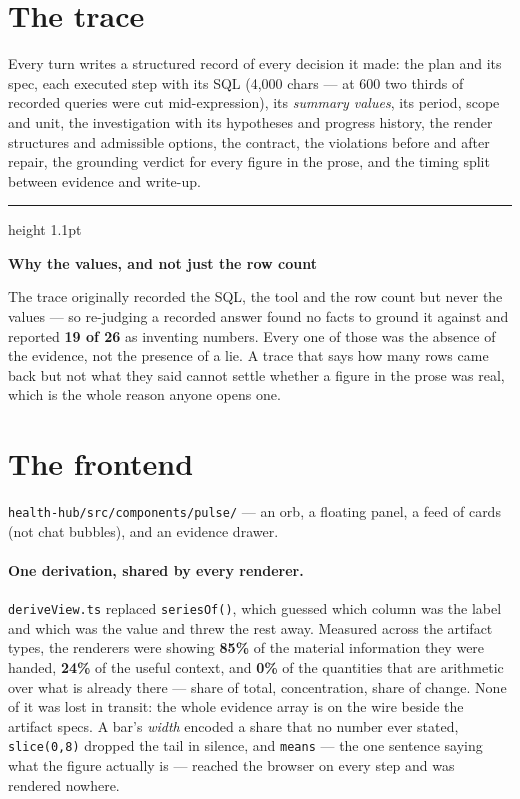 \documentclass[11pt,a4paper]{report}
\newcommand{\file}[1]{\texttt{\small #1}}
\newcommand{\code}[1]{\texttt{\small #1}}
\newenvironment{keybox}[1]
 {\par\medskip\begin{center}\begin{minipage}{0.94\textwidth}%
  {\color{navy}\hrule height 1.1pt}\vspace{5pt}\par
  \textbf{\color{navy}#1}\par\vspace{3pt}\small}
 {\par\vspace{5pt}{\color{mist}\hrule height 0.8pt}\end{minipage}\end{center}\medskip}
\begin{document}
\section{The trace}

Every turn writes a structured record of every decision it made: the plan and its spec, each
executed step with its SQL (4{,}000 chars --- at 600 two thirds of recorded queries were cut
mid-expression), its \emph{summary values}, its period, scope and unit, the investigation with its
hypotheses and progress history, the render structures and admissible options, the contract, the
violations before and after repair, the grounding verdict for every figure in the prose, and the
timing split between evidence and write-up.

\begin{keybox}{Why the values, and not just the row count}
The trace originally recorded the SQL, the tool and the row count but never the values --- so
re-judging a recorded answer found no facts to ground it against and reported \textbf{19 of 26} as
inventing numbers. Every one of those was the absence of the evidence, not the presence of a lie. A
trace that says how many rows came back but not what they said cannot settle whether a figure in
the prose was real, which is the whole reason anyone opens one.
\end{keybox}

\section{The frontend}

\file{health-hub/src/components/pulse/} --- an orb, a floating panel, a feed of cards (not chat
bubbles), and an evidence drawer.

\paragraph{One derivation, shared by every renderer.} \file{deriveView.ts} replaced
\code{seriesOf()}, which guessed which column was the label and which was the value and threw the
rest away. Measured across the artifact types, the renderers were showing \textbf{85\%} of the
material information they were handed, \textbf{24\%} of the useful context, and \textbf{0\%} of the
quantities that are arithmetic over what is already there --- share of total, concentration, share
of change. None of it was lost in transit: the whole evidence array is on the wire beside the
artifact specs. A bar's \emph{width} encoded a share that no number ever stated, \code{slice(0,8)}
dropped the tail in silence, and \code{means} --- the one sentence saying what the figure actually
is --- reached the browser on every step and was rendered nowhere.
\end{document}
